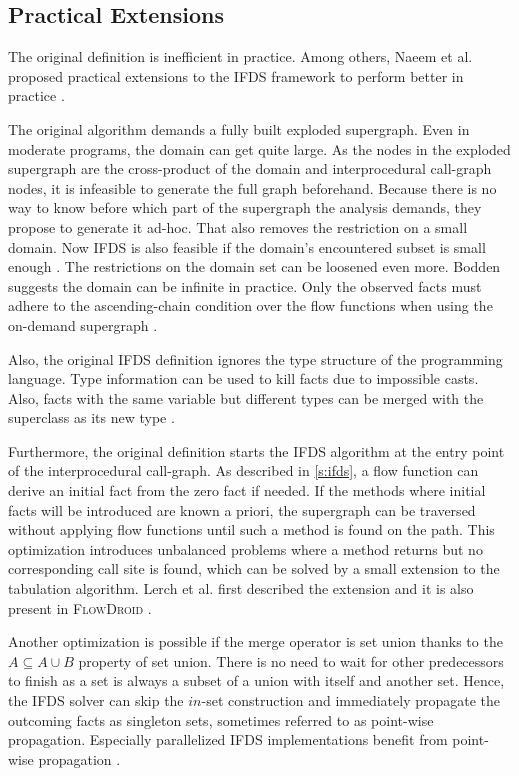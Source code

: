 \documentclass[../draft.tex]{subfiles}
\begin{document}
    \subsection{Practical Extensions}\label{s:ifdspractical}
    The original definition is inefficient in practice.
    Among others, Naeem et al. proposed practical extensions to the IFDS framework to perform better in practice \cite{Naeem2010}.

    The original algorithm demands a fully built exploded supergraph.
    Even in moderate programs, the domain can get quite large.
    As the nodes in the exploded supergraph are the cross-product of the domain and interprocedural call-graph nodes, it is infeasible to generate the full graph beforehand.
    Because there is no way to know before which part of the supergraph the analysis demands, they propose to generate it ad-hoc.
    That also removes the restriction on a small domain.
    Now IFDS is also feasible if the domain's encountered subset is small enough \cite{Naeem2010}.
    The restrictions on the domain set can be loosened even more.
    Bodden suggests the domain can be infinite in practice.
    Only the observed facts must adhere to the ascending-chain condition over the flow functions when using the on-demand supergraph \cite{Bodden2012}.

    Also, the original IFDS definition ignores the type structure of the programming language.
    Type information can be used to kill facts due to impossible casts.
    Also, facts with the same variable but different types can be merged with the superclass as its new type \cite{Naeem2010}.

    Furthermore, the original definition starts the IFDS algorithm at the entry point of the interprocedural call-graph.
    As described in \autoref{s:ifds}, a flow function can derive an initial fact from the zero fact if needed.
    If the methods where initial facts will be introduced are known a priori, the supergraph can be traversed without applying flow functions until such a method is found on the path.
    This optimization introduces unbalanced problems where a method returns but no corresponding call site is found, which can be solved by a small extension to the tabulation algorithm.
    Lerch et al. first described the extension \cite{Lerch2015} and it is also present in \textsc{FlowDroid} \cite{Arzt2017PhD}.

    Another optimization is possible if the merge operator is set union thanks to the $A \subseteq A \cup B$ property of set union.
    There is no need to wait for other predecessors to finish as a set is always a subset of a union with itself and another set.
    Hence, the IFDS solver can skip the $in$-set construction and immediately propagate the outcoming facts as singleton sets, sometimes referred to as point-wise propagation.
    Especially parallelized IFDS implementations benefit from point-wise propagation \cite{Rodriguez2011}.
\end{document}
